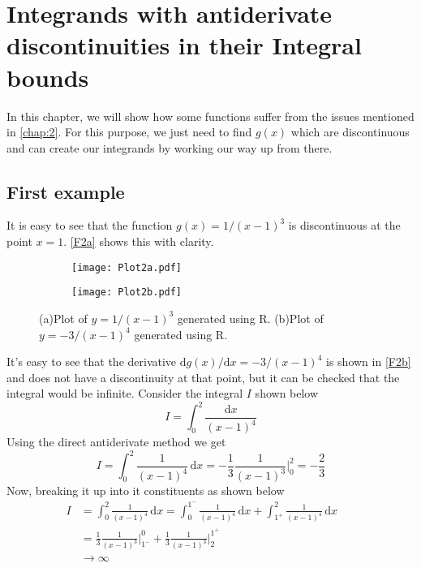 \chapter{Integrands with antiderivate discontinuities in their Integral bounds}
\label{chap:3}

In this chapter, we will show how some functions suffer from the issues mentioned in \autoref{chap:2}. For this purpose, we just need to find $g(x)$ which are discontinuous and can create our integrands by working our way up from there.

\section{First example}
It is easy to see that the function $g(x) = 1/(x-1)^3$ is discontinuous at the point $x=1$. \autoref{F2a} shows this with clarity.
\begin{figure}[h]
	\centering
	\begin{subfigure}[t]{0.49\textwidth}
		\centering
		\texttt{[image: Plot2a.pdf]}
		\label{F2a}
	\end{subfigure}
	\hfill
	\begin{subfigure}[t]{0.49\textwidth}
		\centering
		\texttt{[image: Plot2b.pdf]}
		\label{F2b}
	\end{subfigure}
	\caption{(a)Plot of $y=1/(x-1)^3$ generated using R. (b)Plot of $y = -3/(x-1)^4$ generated using R.}\label{F2}
\end{figure}
It's easy to see that the derivative $\mathrm{d}g(x)/\mathrm{d}x = -3/(x-1)^4$ is shown in \autoref{F2b} and does not have a discontinuity at that point, but it can be checked that the integral would be infinite.
Consider the integral $I$ shown below $$I = \int_{0}^{2}\frac{\mathrm{d}x}{(x - 1)^4}$$
Using the direct antiderivate method we get
$$I = \int_{0}^{2}\frac{1}{(x-1)^4}\,\mathrm{d}x = -\frac{1}{3}\frac{1}{(x-1)^3}\bigg\rvert_{0}^{2} = -\frac{2}{3}$$
Now, breaking it up into it constituents as shown below
\begin{align*}
	I &= \int_{0}^{2}\frac{1}{(x-1)^4}\,\mathrm{d}x = \int_{0}^{1^-}\frac{1}{(x-1)^4}\,\mathrm{d}x + \int_{1^+}^{2}\frac{1}{(x-1)^4}\,\mathrm{d}x \\
	&=\frac{1}{3}\frac{1}{(x-1)^3}\bigg\rvert_{1^-}^{0} + \frac{1}{3}\frac{1}{(x-1)^3}\bigg\rvert_{2}^{1^+} \\
	& \to \infty &&
\end{align*}

